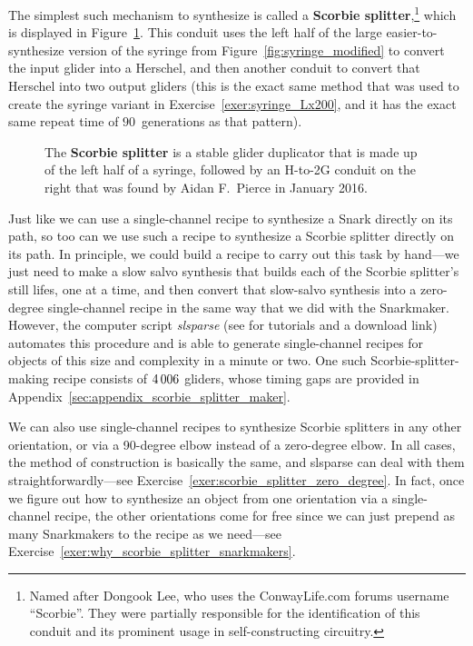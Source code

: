The simplest such mechanism to synthesize is called a \textbf{Scorbie splitter},\footnote{Named after Dongook Lee, who uses the ConwayLife.com forums username ``Scorbie''. They were partially responsible for the identification of this conduit and its prominent usage in self-constructing circuitry.} which is displayed in Figure~\ref{fig:scorbie_splitter}. This conduit uses the left half of the large easier-to-synthesize version of the syringe from Figure~\ref{fig:syringe_modified} to convert the input glider into a Herschel, and then another conduit to convert that Herschel into two output gliders (this is the exact same method that was used to create the syringe variant in Exercise~\ref{exer:syringe_Lx200}, and it has the exact same repeat time of $90$~generations as that pattern).

\begin{figure}[!htb]
	\centering
	\caption{The \textbf{Scorbie splitter} is a stable glider duplicator that is made up of the left half of a syringe, followed by an H-to-2G conduit on the right that was found by Aidan F.~Pierce in January 2016.}
	\label{fig:scorbie_splitter}
\end{figure}

Just like we can use a single-channel recipe to synthesize a Snark directly on its path, so too can we use such a recipe to synthesize a Scorbie splitter directly on its path. In principle, we could build a recipe to carry out this task by hand---we just need to make a slow salvo synthesis that builds each of the Scorbie splitter's still lifes, one at a time, and then convert that slow-salvo synthesis into a zero-degree single-channel recipe in the same way that we did with the Snarkmaker. However, the computer script \emph{slsparse} (see  for tutorials and a download link) automates this procedure and is able to generate single-channel recipes for objects of this size and complexity in a minute or two. One such Scorbie-splitter-making recipe consists of $4{\,}006$ gliders, whose timing gaps are provided in Appendix~\ref{sec:appendix_scorbie_splitter_maker}.

We can also use single-channel recipes to synthesize Scorbie splitters in any other orientation, or via a 90-degree elbow instead of a zero-degree elbow. In all cases, the method of construction is basically the same, and slsparse can deal with them straightforwardly---see Exercise~\ref{exer:scorbie_splitter_zero_degree}. In fact, once we figure out how to synthesize an object from one orientation via a single-channel recipe, the other orientations come for free since we can just prepend as many Snarkmakers to the recipe as we need---see Exercise~\ref{exer:why_scorbie_splitter_snarkmakers}.


